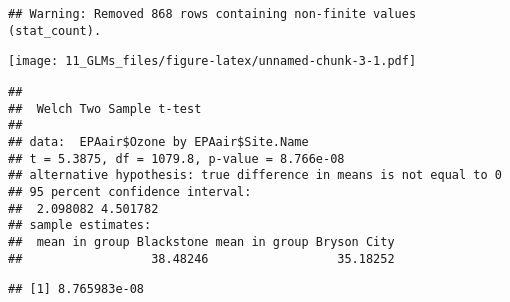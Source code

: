 \documentclass[]{article}
\newenvironment{Shaded}{\begin{snugshade}}{\end{snugshade}}
\newcommand{\KeywordTok}[1]{\textcolor[rgb]{0.13,0.29,0.53}{\textbf{#1}}}
\newcommand{\StringTok}[1]{\textcolor[rgb]{0.31,0.60,0.02}{#1}}
\newcommand{\CommentTok}[1]{\textcolor[rgb]{0.56,0.35,0.01}{\textit{#1}}}
\newcommand{\OperatorTok}[1]{\textcolor[rgb]{0.81,0.36,0.00}{\textbf{#1}}}
\newcommand{\NormalTok}[1]{#1}
\begin{document}
\begin{verbatim}
## Warning: Removed 868 rows containing non-finite values (stat_count).
\end{verbatim}

\texttt{[image: 11\_GLMs\_files/figure-latex/unnamed-chunk-3-1.pdf]}

\begin{Shaded}
\end{Shaded}

\begin{verbatim}
## 
##  Welch Two Sample t-test
## 
## data:  EPAair$Ozone by EPAair$Site.Name
## t = 5.3875, df = 1079.8, p-value = 8.766e-08
## alternative hypothesis: true difference in means is not equal to 0
## 95 percent confidence interval:
##  2.098082 4.501782
## sample estimates:
##  mean in group Blackstone mean in group Bryson City 
##                  38.48246                  35.18252
\end{verbatim}

\begin{Shaded}
\end{Shaded}

\begin{verbatim}
## [1] 8.765983e-08
\end{verbatim}

\begin{Shaded}
\end{Shaded}
\end{document}
